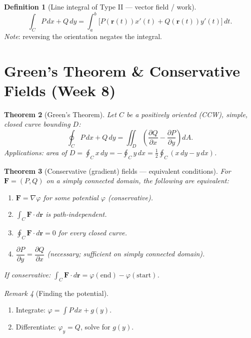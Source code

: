 \documentclass[12pt,a4paper]{article}
\newtheorem{theorem}{Theorem}[section]
\theoremstyle{definition}
\newtheorem{definition}[theorem]{Definition}
\theoremstyle{remark}
\newtheorem{remark}[theorem]{Remark}
\newcommand{\grad}{\nabla}
\newcommand{\pd}[2]{\dfrac{\partial #1}{\partial #2}}
\begin{document}
\begin{definition}[Line integral of Type II --- vector field / work]
\[
  \int_C P\,dx+Q\,dy = \int_a^b \bigl[P(\mathbf{r}(t))x'(t)+Q(\mathbf{r}(t))y'(t)\bigr]\,dt.
\]
\textit{Note}: reversing the orientation negates the integral.
\end{definition}

\section{Green's Theorem \& Conservative Fields (Week 8)}

\begin{theorem}[Green's Theorem]
Let $C$ be a positively oriented (CCW), simple, closed curve bounding $D$:
\[
  \oint_C P\,dx+Q\,dy = \iint_D\left(\pd{Q}{x}-\pd{P}{y}\right)dA.
\]
\textit{Applications}: area of $D = \oint_C x\,dy = -\oint_C y\,dx = \tfrac12\oint_C(x\,dy-y\,dx)$.
\end{theorem}

\begin{theorem}[Conservative (gradient) fields --- equivalent conditions]
For $\mathbf{F}=(P,Q)$ on a simply connected domain, the following are equivalent:
\begin{enumerate}
  \item $\mathbf{F}=\grad\varphi$ for some potential $\varphi$ (\emph{conservative}).
  \item $\int_C\mathbf{F}\cdot d\mathbf{r}$ is path-independent.
  \item $\oint_C\mathbf{F}\cdot d\mathbf{r}=0$ for every closed curve.
  \item $\displaystyle\pd{P}{y}=\pd{Q}{x}$ \quad (\emph{necessary}; \emph{sufficient} on simply connected domain).
\end{enumerate}
If conservative: $\displaystyle\int_C\mathbf{F}\cdot d\mathbf{r}=\varphi(\text{end})-\varphi(\text{start})$.
\end{theorem}

\begin{remark}[Finding the potential]
\begin{enumerate}
  \item Integrate: $\varphi=\int P\,dx + g(y)$.
  \item Differentiate: $\varphi_y=Q$, solve for $g(y)$.
\end{enumerate}
\end{remark}
\end{document}
